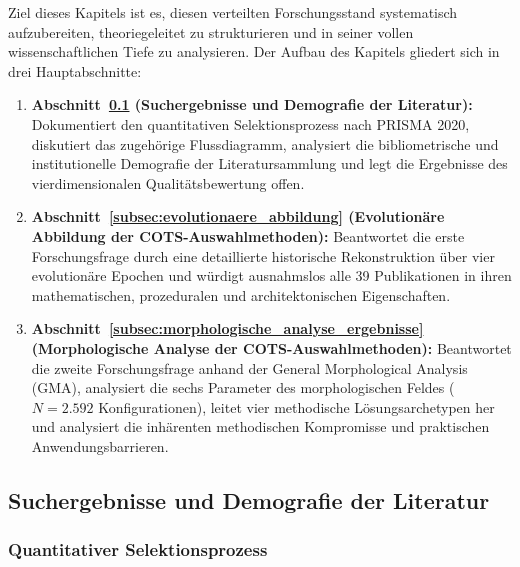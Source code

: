 Ziel dieses Kapitels ist es, diesen verteilten Forschungsstand systematisch aufzubereiten, theoriegeleitet zu strukturieren und in seiner vollen wissenschaftlichen Tiefe zu analysieren. Der Aufbau des Kapitels gliedert sich in drei Hauptabschnitte:
\begin{enumerate}[label=\textbf{\arabic*.}]
  \item \textbf{Abschnitt~\ref{subsec:suchergebnisse_demografie} (Suchergebnisse und Demografie der Literatur):} Dokumentiert den quantitativen Selektionsprozess nach PRISMA 2020, diskutiert das zugehörige Flussdiagramm, analysiert die bibliometrische und institutionelle Demografie der Literatursammlung und legt die Ergebnisse des vierdimensionalen Qualitätsbewertung offen.
  \item \textbf{Abschnitt~\ref{subsec:evolutionaere_abbildung} (Evolutionäre Abbildung der COTS-Auswahlmethoden):} Beantwortet die erste Forschungsfrage durch eine detaillierte historische Rekonstruktion über vier evolutionäre Epochen und würdigt ausnahmslos alle 39 Publikationen in ihren mathematischen, prozeduralen und architektonischen Eigenschaften.
  \item \textbf{Abschnitt~\ref{subsec:morphologische_analyse_ergebnisse} (Morphologische Analyse der COTS-Auswahlmethoden):} Beantwortet die zweite Forschungsfrage anhand der General Morphological Analysis (GMA), analysiert die sechs Parameter des morphologischen Feldes ($N = 2.592$ Konfigurationen), leitet vier methodische Lösungsarchetypen her und analysiert die inhärenten methodischen Kompromisse und praktischen Anwendungsbarrieren.
\end{enumerate}

\subsection{Suchergebnisse und Demografie der Literatur}
\label{subsec:suchergebnisse_demografie}

\subsubsection{Quantitativer Selektionsprozess}
\label{subsubsec:prisma_verlauf}


